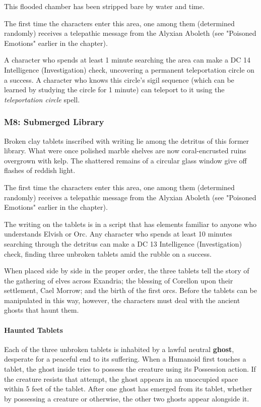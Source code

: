 \documentclass[letterpaper, 11pt, bg=full, twocolumn]{dndbook}
\begin{document}
This flooded chamber has been stripped bare by water and time.

The first time the characters enter this area, one among them (determined randomly) receives a telepathic message from the Alyxian Aboleth (see "Poisoned Emotions" earlier in the chapter).

A character who spends at least 1 minute searching the area can make a DC 14 Intelligence (Investigation) check, uncovering a permanent teleportation circle on a success. A character who knows this circle's sigil sequence (which can be learned by studying the circle for 1 minute) can teleport to it using the \textit{teleportation circle} spell.

\subsubsection{M8: Submerged Library}

\begin{DndReadAloud}
Broken clay tablets inscribed with writing lie among the detritus of this former library. What were once polished marble shelves are now coral-encrusted ruins overgrown with kelp. The shattered remains of a circular glass window give off flashes of reddish light.
\end{DndReadAloud}

The first time the characters enter this area, one among them (determined randomly) receives a telepathic message from the Alyxian Aboleth (see "Poisoned Emotions" earlier in the chapter).

The writing on the tablets is in a script that has elements familiar to anyone who understands Elvish or Orc. Any character who spends at least 10 minutes searching through the detritus can make a DC 13 Intelligence (Investigation) check, finding three unbroken tablets amid the rubble on a success.

When placed side by side in the proper order, the three tablets tell the story of the gathering of elves across Exandria; the blessing of Corellon upon their settlement, Cael Morrow; and the birth of the first orcs. Before the tablets can be manipulated in this way, however, the characters must deal with the ancient ghosts that haunt them.

\paragraph{Haunted Tablets}

Each of the three unbroken tablets is inhabited by a lawful neutral \textbf{ghost}, desperate for a peaceful end to its suffering. When a Humanoid first touches a tablet, the ghost inside tries to possess the creature using its Possession action. If the creature resists that attempt, the ghost appears in an unoccupied space within 5 feet of the tablet. After one ghost has emerged from its tablet, whether by possessing a creature or otherwise, the other two ghosts appear alongside it.
\end{document}
